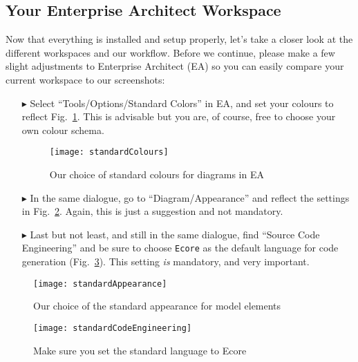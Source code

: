 \visHeader

\subsection{Your Enterprise Architect Workspace}

Now\hypertarget{projectStructure vis}{} that everything is installed and setup properly, let's take a closer look at the different workspaces and our workflow.
Before we continue, please make a few slight adjustments to Enterprise Architect (EA) so you can easily compare your current workspace to our screenshots:
\begin{itemize}

\item[$\blacktriangleright$] Select ``Tools/Options/Standard Colors'' in EA, and set your colours to reflect Fig.~\ref{fig_standardColoursEA}.
This is advisable but you are, of course, free to choose your own colour schema.

\begin{figure}[htbp]
  \centering
  \texttt{[image: standardColours]}
  \caption{Our choice of standard colours for diagrams in EA}
  \label{fig_standardColoursEA}
\end{figure}

\item[$\blacktriangleright$] In the same dialogue, go to ``Diagram/Appearance'' and reflect the settings in Fig.~\ref{fig_standardAppearanceEA}.
Again, this is just a suggestion and not mandatory.

\item[$\blacktriangleright$] Last but not least, and still in the same dialogue, find ``Source Code Engineering'' and be sure to choose \texttt{Ecore} as the
default language for code generation (Fig.~\ref{fig_standardSCEEA}). This setting \emph{is} mandatory, and very important.
\end{itemize}

\begin{figure}[htbp]
  \centering
  \texttt{[image: standardAppearance]}
  \caption{Our choice of the standard appearance for model elements}
  \label{fig_standardAppearanceEA}
\end{figure}


\begin{figure}[htbp]
    \centering
    \texttt{[image: standardCodeEngineering]}
    \caption{Make sure you set the standard language to Ecore}
    \label{fig_standardSCEEA}
 \end{figure}
 
